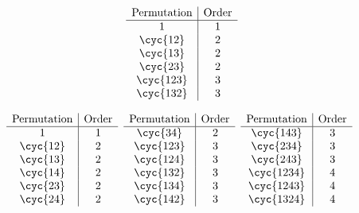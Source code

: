 \begin{solenum}
    \item
    \[
        \begin{array}{*{1}{c|}c}
            \text{Permutation} & \text{Order} \\
            \hline
            1 & 1 \\
            \cyc{1 2} & 2 \\
            \cyc{1 3} & 2 \\
            \cyc{2 3} & 2 \\
            \cyc{1 2 3} & 3 \\
            \cyc{1 3 2} & 3
        \end{array}
    \]
    \item 
    \[
        \begin{array}{*{1}{c|}c}
            \text{Permutation} & \text{Order} \\
            \hline
            1 & 1 \\
            \cyc{1 2} & 2 \\
            \cyc{1 3} & 2 \\
            \cyc{1 4} & 2 \\
            \cyc{2 3} & 2 \\
            \cyc{2 4} & 2
        \end{array}\enspace
        \begin{array}{*{1}{c|}c}
            \text{Permutation} & \text{Order} \\
            \hline
            \cyc{3 4} & 2 \\
            \cyc{1 2 3} & 3 \\
            \cyc{1 2 4} & 3 \\
            \cyc{1 3 2} & 3 \\
            \cyc{1 3 4} & 3 \\
            \cyc{1 4 2} & 3
        \end{array}\enspace
        \begin{array}{*{1}{c|}c}
            \text{Permutation} & \text{Order} \\
            \hline
            \cyc{1 4 3} & 3 \\
            \cyc{2 3 4} & 3 \\
            \cyc{2 4 3} & 3 \\
            \cyc{1 2 3 4} & 4 \\
            \cyc{1 2 4 3} & 4 \\
            \cyc{1 3 2 4} & 4
        \end{array}\enspace
\]
\end{solenum}
